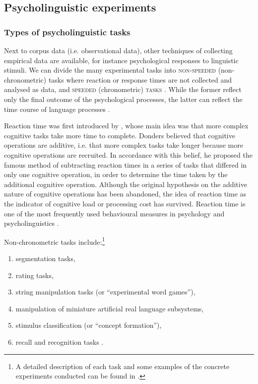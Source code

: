 \subsection{Psycholinguistic experiments}
\subsubsection{Types of psycholinguistic tasks}
\largerpage
\label{Types of psycholinguistic tasks}
Next to corpus data (i.e. observational data), other techniques of collecting empirical data are available, for instance psychological responses to linguistic stimuli. We can divide the many experimental tasks into \textsc{non-speeded} (non-chro\-no\-me\-tric) tasks where reaction or response times are not collected and analysed as data, and \textsc{speeded} (chronometric) \textsc{tasks} \citep[cf.][237]{DAH09}. While the former reflect only the final outcome of the psychological processes, the latter can reflect the time course of language processes \citep[3]{Myers17}. 

Reaction time was first introduced by \citet{Donders68}, whose main idea was that more complex cognitive tasks take more time to complete. Donders believed that cognitive operations are additive, i.e. that more complex tasks take longer because more cognitive operations are recruited. In accordance with this belief, he proposed the famous method of subtracting reaction times in a series of tasks that differed in only one cognitive operation, in order to determine the time taken by the additional cognitive operation. Although the original hypothesis on the additive nature of cognitive operations has been abandoned, the idea of reaction time as the indicator of cognitive load or processing cost has survived. Reaction time is one of the most frequently used behavioural measures in psychology and psycholinguistics \citep{Luce86}.
  
Non-chronometric  tasks include:\footnote{A detailed description of each task and some examples of the concrete experiments conducted can be found in \citet{DAH09}.}

\begin{enumerate}
	
 \item segmentation tasks,
 \item rating tasks,
 \item string manipulation tasks (or ``experimental word games''),
 \item manipulation of miniature artificial real language subsystems, 
 \item stimulus classification (or ``concept formation''),
 \item recall and recognition tasks \citep[240]{DAH09}. 
 
\end{enumerate}

